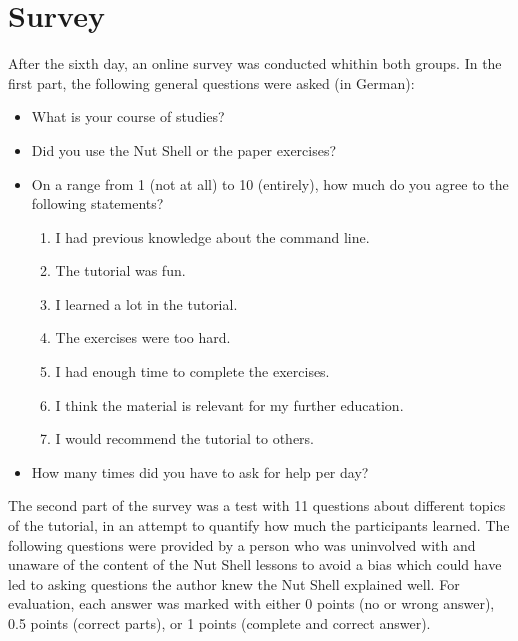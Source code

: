 \documentclass[paper=a4,twoside,abstract=on,cleardoublepage=empty,numbers=noenddot,toc=bib,12pt,appendixprefix=true]{scrreprt}
\begin{document}
\section{Survey}

After the sixth day, an online survey was conducted whithin both groups. In the first part, the following general questions were asked (in German):

\begin{itemize}
    \item What is your course of studies?
    \item Did you use the Nut Shell or the paper exercises?
    \item On a range from 1 (not at all) to 10 (entirely), how much do you agree to the following statements?
        \begin{enumerate}
            \item I had previous knowledge about the command line.
            \item The tutorial was fun.
            \item I learned a lot in the tutorial.
            \item The exercises were too hard.
            \item I had enough time to complete the exercises.
            \item I think the material is relevant for my further education.
            \item I would recommend the tutorial to others.
        \end{enumerate}
    \item How many times did you have to ask for help per day?
\end{itemize}

The second part of the survey was a test with 11 questions about different topics of the tutorial, in an attempt to quantify how much the participants learned. The following questions were provided by a person who was uninvolved with and unaware of the content of the Nut Shell lessons to avoid a bias which could have led to asking questions the author knew the Nut Shell explained well. For evaluation, each answer was marked with either 0 points (no or wrong answer), 0.5 points (correct parts), or 1 points (complete and correct answer).
\end{document}
